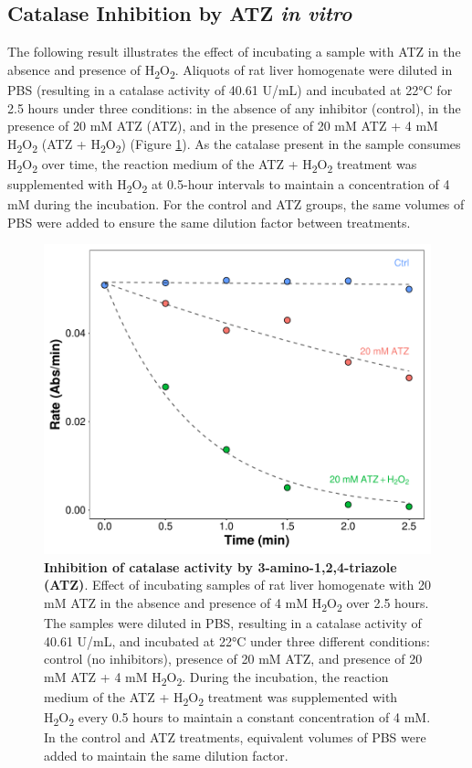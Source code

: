 \documentclass[
  9pt,
  american,
  a5paper,
  extrafontsizes,onecolumn,openright
  ]{memoir}
\begin{document}
\subsection{\texorpdfstring{Catalase Inhibition by ATZ \emph{in vitro}}{Catalase Inhibition by ATZ in vitro}}\label{catalase-inhibition-by-atz-in-vitro}

The following result illustrates the effect of incubating a sample with ATZ in the absence and presence of H\textsubscript{2}O\textsubscript{2}. Aliquots of rat liver homogenate were diluted in PBS (resulting in a catalase activity of 40.61 U/mL) and incubated at 22°C for 2.5 hours under three conditions: in the absence of any inhibitor (control), in the presence of 20 mM ATZ (ATZ), and in the presence of 20 mM ATZ + 4 mM H\textsubscript{2}O\textsubscript{2} (ATZ + H\textsubscript{2}O\textsubscript{2}) (Figure \ref{fig:cat-fig-inhibitor}). As the catalase present in the sample consumes H\textsubscript{2}O\textsubscript{2} over time, the reaction medium of the ATZ + H\textsubscript{2}O\textsubscript{2} treatment was supplemented with H\textsubscript{2}O\textsubscript{2} at 0.5-hour intervals to maintain a concentration of 4 mM during the incubation. For the control and ATZ groups, the same volumes of PBS were added to ensure the same dilution factor between treatments.



\scriptsize

\begin{figure}

{\centering \includegraphics[width=0.5\linewidth]{Volume-1_files/figure-latex/cat-fig-inhibitor-1} 

}

\caption{\textbf{Inhibition of catalase activity by 3-amino-1,2,4-triazole (ATZ)}. Effect of incubating samples of rat liver homogenate with 20 mM ATZ in the absence and presence of 4 mM H\textsubscript{2}O\textsubscript{2} over 2.5 hours. The samples were diluted in PBS, resulting in a catalase activity of 40.61 U/mL, and incubated at 22°C under three different conditions: control (no inhibitors), presence of 20 mM ATZ, and presence of 20 mM ATZ + 4 mM H\textsubscript{2}O\textsubscript{2}. During the incubation, the reaction medium of the ATZ + H\textsubscript{2}O\textsubscript{2} treatment was supplemented with H\textsubscript{2}O\textsubscript{2} every 0.5 hours to maintain a constant concentration of 4 mM. In the control and ATZ treatments, equivalent volumes of PBS were added to maintain the same dilution factor.}\label{fig:cat-fig-inhibitor}
\end{figure}
\end{document}
